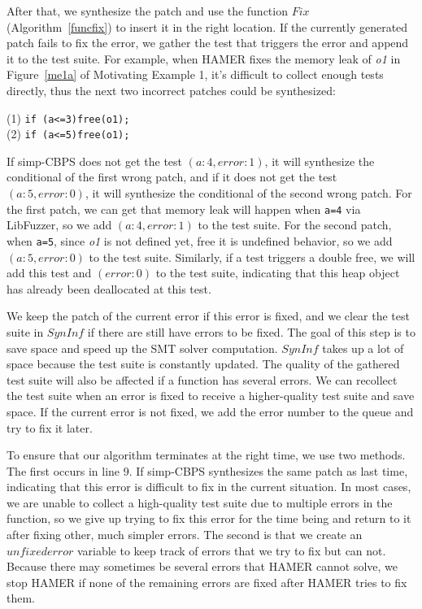\documentclass[a4paper,11pt,oneside,openany]{book}
\begin{document}
After that, we synthesize the patch and use the function $Fix$ (Algorithm~\ref{funcfix}) to insert it in the right location. If the currently generated patch fails to fix the error, we gather the test that triggers the error and append it to the test suite. For example, when HAMER fixes the memory leak of {\it o1} in Figure~\ref{me1a} of Motivating Example 1, it's difficult to collect enough tests directly, thus the next two incorrect patches could be synthesized:


\begin{minipage}{\textwidth}
    \vspace{0.2cm}
    \hspace{0.3cm}(1) \verb|if (a<=3)free(o1);|\\\hspace{0.3cm}(2) \verb|if (a<=5)free(o1);|
\end{minipage}
If simp-CBPS does not get the test $(a:4, error:1)$, it will synthesize the conditional of the first wrong patch, and if it does not get the test $(a:5, error:0)$, it will synthesize the conditional of the second wrong patch. For the first patch, we can get that memory leak will happen when \verb|a=4| via LibFuzzer, so we add $(a:4, error:1)$ to the test suite. For the second patch, when \verb|a=5|, since {\it o1} is not defined yet, free it is undefined behavior, so we add $(a:5, error:0)$ to the test suite. Similarly, if a test triggers a double free, we will add this test and $(error:0)$ to the test suite, indicating that this heap object has already been deallocated at this test.


We keep the patch of the current error if this error is fixed, and we clear the test suite in $SynInf$ if there are still have errors to be fixed. The goal of this step is to save space and speed up the SMT solver computation. $SynInf$ takes up a lot of space because the test suite is constantly updated. The quality of the gathered test suite will also be affected if a function has several errors. We can recollect the test suite when an error is fixed to receive a higher-quality test suite and save space. If the current error is not fixed, we add the error number to the queue and try to fix it later.



To ensure that our algorithm terminates at the right time, we use two methods. The first occurs in line 9. If simp-CBPS synthesizes the same patch as last time, indicating that this error is difficult to fix in the current situation. In most cases, we are unable to collect a high-quality test suite due to multiple errors in the function, so we give up trying to fix this error for the time being and return to it after fixing other, much simpler errors. The second is that we create an $unfixederror$ variable to keep track of errors that we try to fix but can not. Because there may sometimes be several errors that HAMER cannot solve, we stop HAMER if none of the remaining errors are fixed after HAMER tries to fix them.
\end{document}
